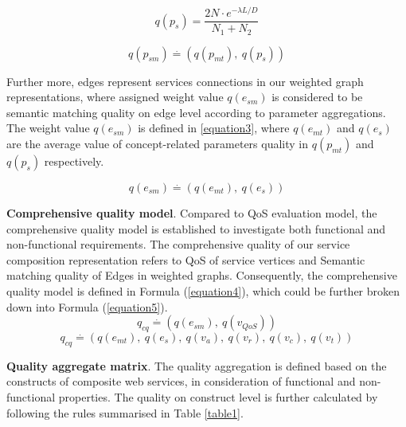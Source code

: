 \documentclass{IEEEtran}
\begin{document}
\begin{equation}
q(p_ {s}){=} \frac{2N \cdot e^{-\lambda L/D} }{N_{1}+N_{2}}
\label{equation1}
\end{equation}

\begin{equation}
\label{equation2}
q(p_{sm}) \stackrel{.}{=} (q(p_ {mt}), \  q(p_ {s}))
\end{equation}

Further more, edges represent services connections in our weighted graph representations, where assigned weight value $q(e_{sm})$ is considered to be semantic matching quality on edge level according to parameter aggregations. The weight value $q(e_{sm})$ is defined in \ref{equation3}, where $q(e_ {mt})$ and $q(e_ {s})$ are the average value of concept-related parameters quality in $q(p_{mt})$ and $q(p_{s})$ respectively. 

\begin{equation}
\label{equation3}
q(e_{sm}) \stackrel{.}{=} (q(e_ {mt}), \  q(e_ {s}))
\end{equation}

\textbf{Comprehensive quality model}. Compared to QoS evaluation model, the comprehensive quality model is established to investigate both functional and non-functional requirements. The comprehensive quality of our service composition representation refers to QoS of service vertices and Semantic matching quality of Edges in weighted graphs. Consequently, the comprehensive quality model is defined in Formula (\ref{equation4}), which could be further broken down into Formula (\ref{equation5}). 
\begin{equation}
\label{equation4}
q_{cq} \stackrel{.}{=} (q(e_ {sm}), \  q(v_ {QoS}))
\end{equation}
\begin{equation}
\label{equation5}
q_{cq} \stackrel{.}{=} (q(e_ {mt}), \  q(e_ {s}), \  q(v_{a}),\  q(v_{r}),\  q(v_{c}),\  q(v_{t}))
\end{equation}

\textbf{Quality aggregate matrix}. The quality aggregation is defined based on the constructs of composite web services, in consideration of functional and non-functional properties. The quality on construct level is further calculated by following the rules summarised in Table \ref{table1}. 
\end{document}
